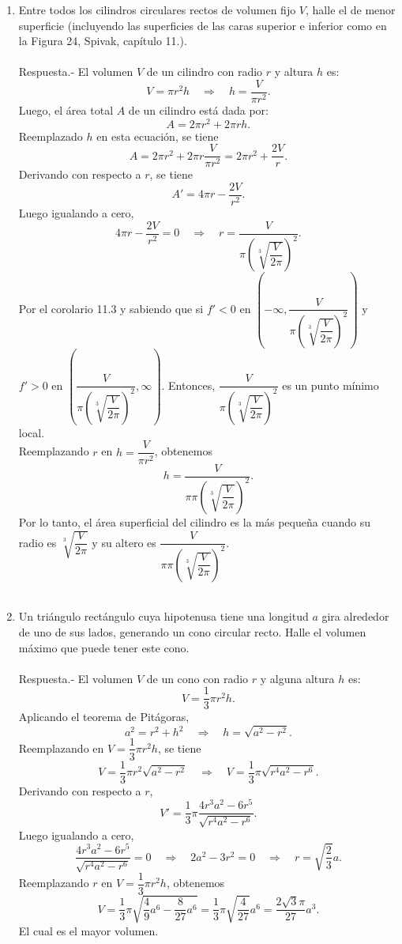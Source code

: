 \begin{enumerate}[\bfseries 1.]
    \item Entre todos los cilindros circulares rectos de volumen fijo $V$, halle el de menor superficie (incluyendo las superficies de las caras superior e inferior como en la Figura 24, Spivak, capítulo 11.).\\\\
	Respuesta.-\; El volumen $V$ de un cilindro con radio $r$ y altura $h$ es:
	$$V=\pi r^2h \quad \Rightarrow \quad h=\dfrac{V}{\pi r^2}.$$
	Luego, el área total $A$ de un cilindro está dada por:
	$$A=2\pi r^2+2\pi rh.$$
	Reemplazado $h$  en esta ecuación, se tiene
	$$A=2\pi r^2+2\pi r\dfrac{V}{\pi r^2}=2\pi r^2+\dfrac{2V}{r}.$$
	Derivando con respecto a $r$, se tiene
	$$A'=4\pi r - \dfrac{2V}{r^2}.$$
	Luego igualando a cero,
	$$4\pi r - \dfrac{2V}{r^2}=0\quad \Rightarrow \quad r=\dfrac{V}{\pi\left(\sqrt[3]{\dfrac{V}{2\pi}}\right)^2}.$$
	Por el corolario 11.3 y sabiendo que si $f'<0$ en $\left(-\infty,\dfrac{V}{\pi\left(\sqrt[3]{\dfrac{V}{2\pi}}\right)^2}\right)$  y $f'>0$ en $\left(\dfrac{V}{\pi\left(\sqrt[3]{\dfrac{V}{2\pi}}\right)^2},\infty\right)$. Entonces, $\dfrac{V}{\pi\left(\sqrt[3]{\dfrac{V}{2\pi}}\right)^2}$ es un punto mínimo local.\\
	Reemplazando $r$ en $h=\dfrac{V}{\pi r^2}$, obtenemos 
	$$h=\dfrac{V}{\pi\pi\left(\sqrt[3]{\dfrac{V}{2\pi}}\right)^2}.$$
	Por lo tanto, el área superficial del cilindro es la más pequeña cuando su radio es $\sqrt[3]{\dfrac{V}{2\pi}}$ y su altero es $\dfrac{V}{\pi\pi\left(\sqrt[3]{\dfrac{V}{2\pi}}\right)^2}$.\\\\

    \item Un triángulo rectángulo cuya hipotenusa tiene una longitud $a$ gira alrededor de uno de sus lados, generando un cono circular recto. Halle el volumen máximo que puede tener este cono.\\\\
	Respuesta.-\; El volumen $V$ de un cono con radio $r$ y alguna altura $h$ es:
	$$V=\dfrac{1}{3}\pi r^2 h.$$
	Aplicando el teorema de Pitágoras,
	$$a^2=r^2+h^2 \quad \Rightarrow \quad h=\sqrt{a^2-r^2}.$$
	Reemplazando en $V=\dfrac{1}{3}\pi r^2 h$, se tiene
	$$V=\dfrac{1}{3}\pi r^2 \sqrt{a^2-r^2}\quad \Rightarrow\quad V=\dfrac{1}{3}\pi\sqrt{r^4a^2-r^6}.$$
	Derivando con respecto a $r$, 
	$$V'=\dfrac{1}{3}\pi\dfrac{4r^3a^2-6r^5}{\sqrt{r^4a^2-r^6}}.$$
	Luego igualando a cero,
	$$\dfrac{4r^3a^2-6r^5}{\sqrt{r^4a^2-r^6}}=0\quad \Rightarrow \quad 2a^2-3r^2=0 \quad \Rightarrow \quad r=\sqrt{\dfrac{2}{3}}a.$$
	Reemplazando $r$ en $V=\dfrac{1}{3}\pi r^2 h$, obtenemos 
	$$V=\dfrac{1}{3}\pi\sqrt{\dfrac{4}{9}a^6-\dfrac{8}{27}a^6}=\dfrac{1}{3}\pi\sqrt{\dfrac{4}{27}}a^6=\dfrac{2\sqrt{3}\pi}{27}a^3.$$
	El cual es el mayor volumen.\\\\


\end{enumerate}
